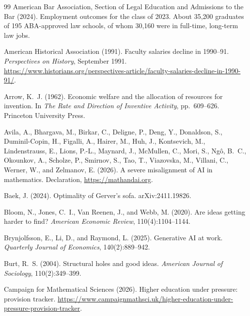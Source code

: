 \documentclass[11pt]{article}
\theoremstyle{definition}
\theoremstyle{remark}
\begin{document}
\begin{thebibliography}{99}
American Bar Association, Section of Legal Education and Admissions to the Bar (2024).
\newblock Employment outcomes for the class of 2023.
\newblock About 35{,}200 graduates of 195 ABA-approved law schools, of whom 30{,}160 were in full-time, long-term law jobs.

American Historical Association (1991).
\newblock Faculty salaries decline in 1990--91.
\newblock \emph{Perspectives on History}, September 1991. \url{https://www.historians.org/perspectives-article/faculty-salaries-decline-in-1990-91/}.

Arrow, K.~J. (1962).
\newblock Economic welfare and the allocation of resources for invention.
\newblock In \emph{The Rate and Direction of Inventive Activity}, pp.\ 609--626. Princeton University Press.

Avila, A., Bhargava, M., Birkar, C., Deligne, P., Deng, Y., Donaldson, S., Duminil-Copin, H., Figalli, A., Hairer, M., Huh, J., Kontsevich, M., Lindenstrauss, E., Lions, P.-L., Maynard, J., McMullen, C., Mori, S., Ng\^o, B.~C., Okounkov, A., Scholze, P., Smirnov, S., Tao, T., Viazovska, M., Villani, C., Werner, W., and Zelmanov, E. (2026).
\newblock A severe misalignment of AI in mathematics.
\newblock Declaration, \url{https://mathandai.org}.

Baek, J. (2024).
\newblock Optimality of Gerver's sofa.
\newblock arXiv:2411.19826.

Bloom, N., Jones, C.~I., Van Reenen, J., and Webb, M. (2020).
\newblock Are ideas getting harder to find?
\newblock \emph{American Economic Review}, 110(4):1104--1144.

Brynjolfsson, E., Li, D., and Raymond, L. (2025).
\newblock Generative AI at work.
\newblock \emph{Quarterly Journal of Economics}, 140(2):889--942.

Burt, R.~S. (2004).
\newblock Structural holes and good ideas.
\newblock \emph{American Journal of Sociology}, 110(2):349--399.

Campaign for Mathematical Sciences (2026).
\newblock Higher education under pressure: provision tracker.
\newblock \url{https://www.campaignmathsci.uk/higher-education-under-pressure-provision-tracker}.


\end{thebibliography}
\end{document}
